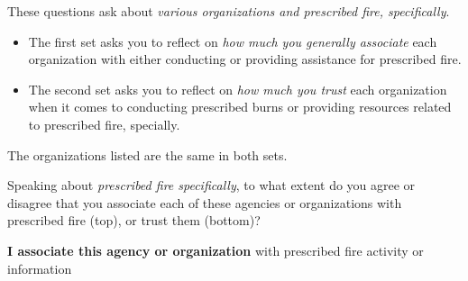 \documentclass[
  english,
  checkmode = fill,
  ]{sdapsclassic}
\begin{document}
\begin{questionnaire}
These questions ask about \emph{various organizations and prescribed fire, specifically}.
\begin{itemize}
\item The first set asks you to reflect on \emph{how much you generally associate} each organization with either conducting or providing assistance for prescribed fire. 
\item The second set asks you to reflect on \emph{how much you trust} each organization when it comes to conducting prescribed burns or providing resources related to prescribed fire, specially.  
\end{itemize}
The organizations listed are the same in both sets.

 Speaking about \emph{prescribed fire specifically}, to what extent do you agree or disagree that you associate each of these agencies or organizations with prescribed fire (top), or trust them (bottom)?   
    
   
      \begin{markgroup}{\textbf{I associate this agency or organization} with prescribed fire activity or information}
         {}~{}
         {}~{}
         {}~{}
         {}~{}
         {}~{}
         {}~{}
         {}~{}
         {}~{}
         {}~{}
         {}~{}
      \end{markgroup}
      

\end{questionnaire}
\end{document}
